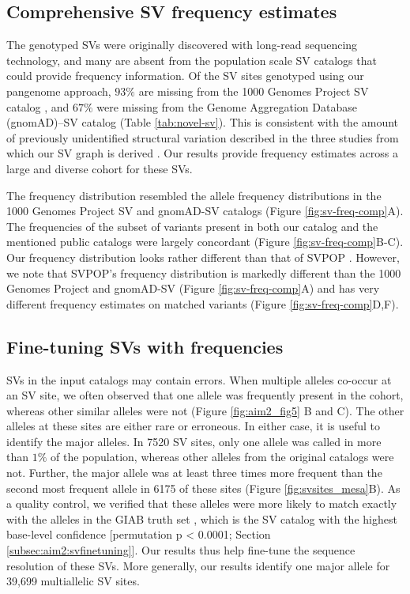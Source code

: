 \documentclass[11pt]{ucscthesis}
\begin{document}
\subsection{Comprehensive SV frequency estimates}
The genotyped SVs were originally discovered with long-read sequencing technology, and many are absent from the population scale SV catalogs that could provide frequency information.
Of the SV sites genotyped using our pangenome approach, $93\%$ are missing from the 1000 Genomes Project SV catalog \cite{1000gp_sv_2015}, and $67\%$ were missing from the Genome Aggregation Database (gnomAD)–SV catalog \cite{gnomadsv_2020} (Table \ref{tab:novel-sv}).
This is consistent with the amount of previously unidentified structural variation described in the three studies from which our SV graph is derived \cite{zook_robust_2020, chaisson_sv_2019,audano_hgsvc}.
Our results provide frequency estimates across a large and diverse cohort for these SVs.

The frequency distribution resembled the allele frequency distributions in the 1000 Genomes Project SV and gnomAD-SV catalogs (Figure \ref{fig:sv-freq-comp}A).
The frequencies of the subset of variants present in both our catalog and the mentioned public catalogs were largely concordant (Figure \ref{fig:sv-freq-comp}B-C).
Our frequency distribution looks rather different than that of SVPOP \cite{audano_hgsvc}.
However, we note that SVPOP’s frequency distribution is markedly different than the 1000 Genomes Project and gnomAD-SV (Figure \ref{fig:sv-freq-comp}A) and has very different frequency estimates on matched variants (Figure \ref{fig:sv-freq-comp}D,F).

\subsection{Fine-tuning SVs with frequencies}
SVs in the input catalogs may contain errors.
When multiple alleles co-occur at an SV site, we often observed that one allele was frequently present in the cohort, whereas other similar alleles were not (Figure \ref{fig:aim2_fig5} B and C).
The other alleles at these sites are either rare or erroneous.
In either case, it is useful to identify the major alleles.
In 7520 SV sites, only one allele was called in more than $1\%$ of the population, whereas other alleles from the original catalogs were not.
Further, the major allele was at least three times more frequent than the second most frequent allele in 6175 of these sites (Figure \ref{fig:svsites_mesa}B).
As a quality control, we verified that these alleles were more likely to match exactly with the alleles in the GIAB truth set \cite{zook_robust_2020}, which is the SV catalog with the highest base-level confidence [permutation p < 0.0001; Section \ref{subsec:aim2:svfinetuning}].
Our results thus help fine-tune the sequence resolution of these SVs.
More generally, our results identify one major allele for 39,699 multiallelic SV sites.
\end{document}
